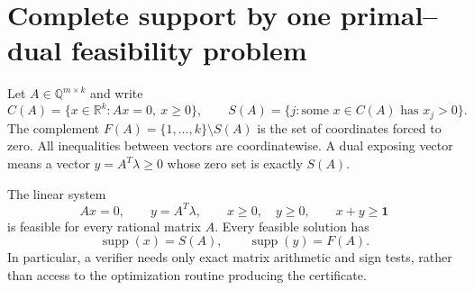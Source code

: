 
\section{Complete support by one primal--dual feasibility problem}

Let $A\in\mathbb Q^{m\times k}$ and write
\[
 C(A)=\{x\in\mathbb R^k:Ax=0,\ x\geq0\},\qquad
 S(A)=\{j:\text{some }x\in C(A)\text{ has }x_j>0\}.
\]
The complement $F(A)=\{1,\ldots,k\}\setminus S(A)$ is the set of
coordinates forced to zero.  All inequalities between vectors are
coordinatewise.  A dual exposing vector means a vector
$y=A^T\lambda\geq0$ whose zero set is exactly $S(A)$.

\begin{theorem}
The linear system
\begin{equation}\label{eq:audit-joint}
 Ax=0,\qquad y=A^T\lambda,\qquad x\geq0,\quad y\geq0,
 \qquad x+y\geq\mathbf1
\end{equation}
is feasible for every rational matrix $A$.  Every feasible solution has
\[
 \operatorname{supp}(x)=S(A),\qquad
 \operatorname{supp}(y)=F(A).
\]
In particular, a verifier needs only exact matrix arithmetic and sign
tests, rather than access to the optimization routine producing the
certificate.
\end{theorem}

